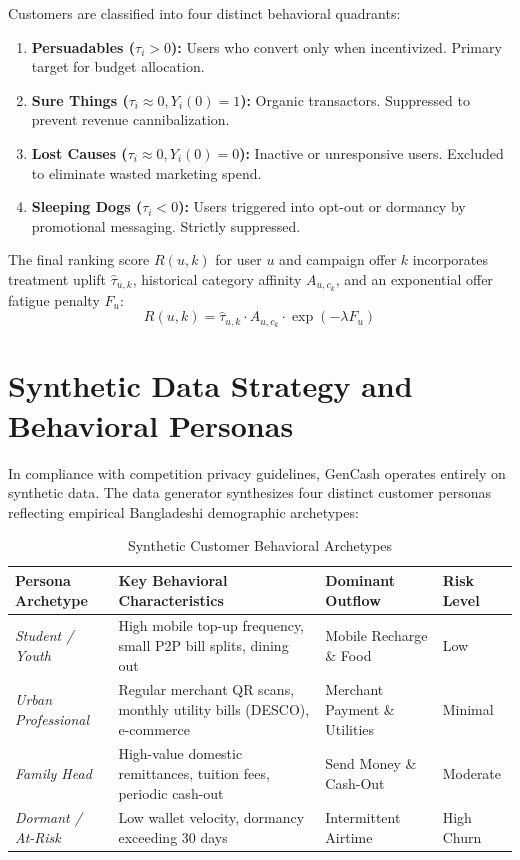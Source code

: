 \documentclass[10.5pt,a4paper]{article}
\begin{document}
Customers are classified into four distinct behavioral quadrants:
\begin{enumerate}
    \item \textbf{Persuadables ($\tau_i > 0$):} Users who convert only when incentivized. Primary target for budget allocation.
    \item \textbf{Sure Things ($\tau_i \approx 0, Y_i(0) = 1$):} Organic transactors. Suppressed to prevent revenue cannibalization.
    \item \textbf{Lost Causes ($\tau_i \approx 0, Y_i(0) = 0$):} Inactive or unresponsive users. Excluded to eliminate wasted marketing spend.
    \item \textbf{Sleeping Dogs ($\tau_i < 0$):} Users triggered into opt-out or dormancy by promotional messaging. Strictly suppressed.
\end{enumerate}

The final ranking score $R(u, k)$ for user $u$ and campaign offer $k$ incorporates treatment uplift $\hat{\tau}_{u,k}$, historical category affinity $A_{u,c_k}$, and an exponential offer fatigue penalty $F_u$:
\begin{equation}
R(u, k) = \hat{\tau}_{u,k} \cdot A_{u,c_k} \cdot \exp(-\lambda F_u)
\end{equation}

\section{Synthetic Data Strategy and Behavioral Personas}

In compliance with competition privacy guidelines, GenCash operates entirely on synthetic data. The data generator synthesizes four distinct customer personas reflecting empirical Bangladeshi demographic archetypes:

\begin{table}[htbp]
\centering
\small
\caption{Synthetic Customer Behavioral Archetypes}
\label{tab:personas}
\begin{tabularx}{\textwidth}{lXll}
\toprule
\textbf{Persona Archetype} & \textbf{Key Behavioral Characteristics} & \textbf{Dominant Outflow} & \textbf{Risk Level} \\
\midrule
\textit{Student / Youth} & High mobile top-up frequency, small P2P bill splits, dining out & Mobile Recharge \& Food & Low \\
\textit{Urban Professional} & Regular merchant QR scans, monthly utility bills (DESCO), e-commerce & Merchant Payment \& Utilities & Minimal \\
\textit{Family Head} & High-value domestic remittances, tuition fees, periodic cash-out & Send Money \& Cash-Out & Moderate \\
\textit{Dormant / At-Risk} & Low wallet velocity, dormancy exceeding 30 days & Intermittent Airtime & High Churn \\
\bottomrule
\end{tabularx}
\end{table}
\end{document}
